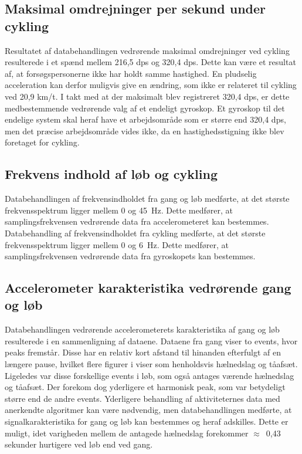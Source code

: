 \subsection{Maksimal omdrejninger per sekund under cykling}
Resultatet af databehandlingen vedrørende maksimal omdrejninger ved cykling resulterede i et spænd mellem 216,5 dps og 320,4 dps. Dette kan være et resultat af, at forsøgspersonerne ikke har holdt samme hastighed. En pludselig acceleration kan derfor muligvis give en ændring, som ikke er relateret til cykling ved 20,9 km/t. I takt med at der maksimalt blev registreret 320,4 dps, er dette medbestemmende vedrørende valg af et endeligt gyroskop. Et gyroskop til det endelige system skal heraf have et arbejdsområde som er større end 320,4 dps, men det præcise arbejdsområde vides ikke, da en hastighedsstigning ikke blev foretaget for cykling.

\subsection{Frekvens indhold af løb og cykling}
Databehandlingen af frekvensindholdet fra gang og løb medførte, at det største frekvensspektrum ligger mellem 0 og 45~Hz. Dette medfører, at samplingsfrekvensen vedrørende data fra accelerometeret kan bestemmes. \\
Databehandling af frekvensindholdet fra cykling medførte, at det største frekvensspektrum ligger mellem 0 og 6~Hz. Dette medfører, at samplingsfrekvensen vedrørende data fra gyroskopets kan bestemmes. 

\subsection{Accelerometer karakteristika vedrørende gang og løb}
Databehandlingen vedrørende accelerometerets karakteristika af gang og løb resulterede i en sammenligning af dataene. Dataene fra gang viser to events, hvor peaks fremstår. Disse har en relativ kort afstand til hinanden efterfulgt af en længere pause, hvilket flere figurer i  viser som henholdsvis hælnedslag og tåafsæt. Ligeledes var disse forskellige events i løb, som også antages værende hælnedslag og tåafsæt. Der forekom dog yderligere et harmonisk peak, som var betydeligt større end de andre events. Yderligere behandling af aktiviteternes data med anerkendte algoritmer kan være nødvendig, men databehandlingen medførte, at signalkarakteristika for gang og løb kan bestemmes og heraf adskilles. Dette er muligt, idet varigheden mellem de antagede hælnedslag forekommer $\approx$~0,43 sekunder hurtigere ved løb end ved gang.

